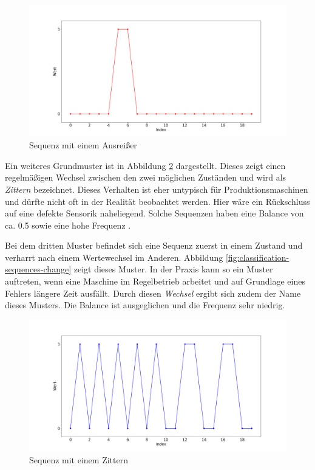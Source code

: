 \begin{figure}[H]
	\centering
	\includegraphics[scale=0.32]{images/sequences/outlier}
	\caption{Sequenz mit einem Ausreißer}
	\label{fig:classification-sequences-outlier}
\end{figure}

Ein weiteres Grundmuster ist in Abbildung \ref{fig:classification-sequences-tremor} dargestellt. Dieses zeigt einen regelmäßigen Wechsel zwischen den zwei möglichen Zuständen und wird als \textit{Zittern} bezeichnet. Dieses Verhalten ist eher untypisch für Produktionsmaschinen und dürfte nicht oft in der Realität beobachtet werden. Hier wäre ein Rückschluss auf eine defekte Sensorik naheliegend. Solche Sequenzen haben eine Balance von ca. 0.5 sowie eine hohe Frequenz .

Bei dem dritten Muster befindet sich eine Sequenz zuerst in einem Zustand und verharrt nach einem Wertewechsel im Anderen. Abbildung \ref{fig:classification-sequences-change} zeigt dieses Muster. In der Praxis kann so ein Muster auftreten, wenn eine Maschine im Regelbetrieb arbeitet und auf Grundlage eines Fehlers längere Zeit ausfällt. Durch diesen \textit{Wechsel} ergibt sich zudem der Name dieses Musters. Die Balance ist ausgeglichen und die Frequenz sehr niedrig.

\begin{figure}[H]
	\centering
	\includegraphics[scale=0.32]{images/sequences/tremor}
	\caption{Sequenz mit einem Zittern}
	\label{fig:classification-sequences-tremor}
\end{figure}

